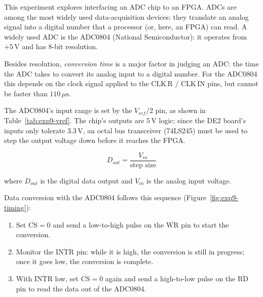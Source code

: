 \begin{introduction}
  This experiment explores interfacing an ADC chip to an FPGA. ADCs are among the most widely used data-acquisition devices: they translate an analog signal into a digital number that a processor (or, here, an FPGA) can read. A widely used ADC is the ADC0804 (National Semiconductor): it operates from $+5\,\text{V}$ and has 8-bit resolution.\vspace*{0.5em}

  Besides resolution, \textit{conversion time} is a major factor in judging an ADC: the time the ADC takes to convert its analog input to a digital number. For the ADC0804 this depends on the clock signal applied to the CLK\,R / CLK\,IN pins, but cannot be faster than $110\,\mu\text{s}$.\vspace*{0.5em}

  The ADC0804's input range is set by the $V_{ref}/2$ pin, as shown in Table~\ref{tab:exp9-vref}. The chip's outputs are 5\,V logic; since the DE2 board's inputs only tolerate 3.3\,V, an octal bus transceiver (74LS245) must be used to step the output voltage down before it reaches the FPGA.

  \begin{center}
    \[
      D_{out} = \frac{V_{in}}{\text{step size}}
    \]
  \end{center}
  where $D_{out}$ is the digital data output and $V_{in}$ is the analog input voltage.

  Data conversion with the ADC0804 follows this sequence (Figure~\ref{fig:exp9-timing}):
  \begin{enumerate}[label=\roman*.]
    \item Set $\overline{\text{CS}} = 0$ and send a low-to-high pulse on the $\overline{\text{WR}}$ pin to start the conversion.
    \item Monitor the $\overline{\text{INTR}}$ pin: while it is high, the conversion is still in progress; once it goes low, the conversion is complete.
    \item With $\overline{\text{INTR}}$ low, set $\overline{\text{CS}} = 0$ again and send a high-to-low pulse on the $\overline{\text{RD}}$ pin to read the data out of the ADC0804.
  \end{enumerate}
\end{introduction}

